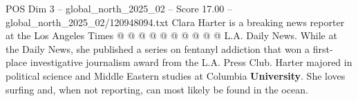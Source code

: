 \begin{textsample}{POS Dim 3 – global\_north\_2025\_02 – Score 17.00 – global\_north\_2025\_02/120948094.txt}
Clara Harter is a breaking news reporter at the Los Angeles Times @ @ @ @ @ @ @ @ @ @ L.A.
Daily News.
While at the Daily News, she published a series on fentanyl addiction that won a first-place investigative journalism award from the L.A.
Press Club.
Harter majored in political science and Middle Eastern studies at Columbia \textbf{University}.
She loves surfing and, when not reporting, can most likely be found in the ocean.

\end{textsample}
